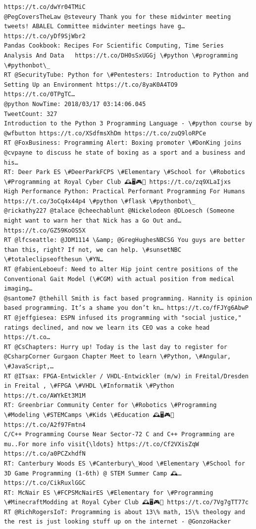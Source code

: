 \documentclass[11pt]{article}
\begin{document}
\begin{Verbatim}[commandchars=\\\{\}]
https://t.co/dwYr04TMiC
@PegCoversTheLaw @steveury Thank you for these midwinter meeting tweets! ABALEL Committee midwinter meetings have g… https://t.co/yDf9SjWbr2
Pandas Cookbook: Recipes For Scientific Computing, Time Series Analysis And Data   https://t.co/DH0sSxUGGj \#python \#programming \#pythonbot\_
RT @SecurityTube: Python for \#Pentesters: Introduction to Python and Setting Up an Environment https://t.co/8yaK0A4TO9  https://t.co/0TPgTC…
@python NowTime: 2018/03/17 03:14:06.045
TweetCount: 327
Introduction to the Python 3 Programming Language - \#python course by @wfbutton https://t.co/XSdfmsXhDm https://t.co/zuQ9loRPCe
RT @FoxBusiness: Programming Alert: Boxing promoter \#DonKing joins @cvpayne to discuss he state of boxing as a sport and a business and his…
RT: Deer Park ES \#DeerParkFCPS \#Elementary \#School for \#Robotics \#Programming at Royal Cyber Club 🕰️🖥️🎮💎 https://t.co/zq9XLaIjxs
High Performance Python: Practical Performant Programming For Humans  https://t.co/3oCq4x44p4 \#python \#flask \#pythonbot\_
@rickathy227 @talace @cheechablunt @Nickelodeon @DLoesch (Someone might want to warn her that Nick has a Go Out and… https://t.co/GZ59KoOS5X
RT @lfcseattle: @JDM1114 \&amp; @GregHughesNBCSG You guys are better than this, right? If not, we can help. \#sunsetNBC \#totaleclipseofthesun \#YN…
RT @fabienLeboeuf: Need to alter Hip joint centre positions of the Conventional Gait Model (\#CGM) with actual position from medical imaging…
@santome7 @thehill Smith is fact based programming. Hannity is opinion based programming. It’s a shame you don’t kn… https://t.co/fFJYg6AbwP
RT @jeffgiesea: ESPN infused its programming with "social justice," ratings declined, and now we learn its CEO was a coke head https://t.co…
RT @CsChapters: Hurry up! Today is the last day to register for @CsharpCorner Gurgaon Chapter Meet to learn \#Python, \#Angular, \#JavaScript,…
RT @ITsax: FPGA-Entwickler / VHDL-Entwickler (m/w) in Freital/Dresden in Freital , \#FPGA \#VHDL \#Informatik \#Python https://t.co/AWYkEt3M1M
RT: Greenbriar Community Center for \#Robotics \#Programming \#Modeling \#STEMCamps \#Kids \#Education 🕰️🖥️🎮💎 https://t.co/A2f97Fmtn4
C/C++ Programming Course Near Sector-72 C and C++ Programming are mu..For more info visit{\ldots} https://t.co/Cf2VXisZqW https://t.co/a0PCZxhdfN
RT: Canterbury Woods ES \#Canterbury\_Wood \#Elementary \#School for 3D Game Programming (1-6th) @ STEM Summer Camp 🕰️… https://t.co/CikRuxlGGC
RT: McNair ES \#FCPSMcNairES \#Elementary for \#Programming \#MinecraftModding at Royal Cyber Club 🕰️🖥️🎮💎 https://t.co/7Vg7gTT77c
RT @RichRogersIoT: Programming is about 13\% math, 15\% theology and the rest is just looking stuff up on the internet - @GonzoHacker

\end{Verbatim}
\end{document}
